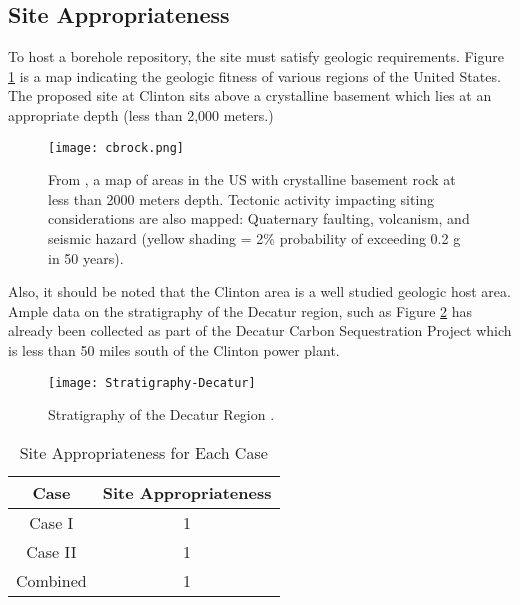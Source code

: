  \subsection{Site Appropriateness} 

  To host a borehole repository, the site must satisfy geologic requirements. 
  Figure \ref{fig:cbrock} is a map indicating the geologic fitness of various 
  regions of the United States. The proposed site at Clinton sits above 
  a crystalline basement which lies at an appropriate depth (less than 2,000 
  meters.)

\begin{figure}[!h] 
  \centering
  \texttt{[image: cbrock.png]}	
        \caption{From \cite{perry_gis_2015}, a map of areas in the US with 
        crystalline basement rock at less than 2000 meters depth. Tectonic 
        activity impacting siting considerations are also mapped:  Quaternary 
        faulting, volcanism, and seismic hazard (yellow shading = 2\% 
        probability of exceeding 0.2 g in 50 years).}
  \label{fig:cbrock}
\end{figure}

    
  
  Also, it should be noted that the Clinton area is a well studied geologic 
  host area. Ample data on the stratigraphy of the Decatur region, such as  
  Figure \ref{fig:Stratigraphy} has already been collected as part of the 
  Decatur Carbon Sequestration Project which is less than 50 miles south of the 
  Clinton power plant.
 
\begin{figure}[!h] 
  \centering
  \texttt{[image: Stratigraphy-Decatur]}	
  \caption{Stratigraphy of the Decatur Region
  \cite{mcdonald_illinois_2012}.}
 \label{fig:Stratigraphy}
  	
 
\end{figure}
  
\begin{table}[h]
	\centering
        \caption {Site Appropriateness for Each Case}
		\begin{tabular}{|c|c|}
			\hline
			Case & Site Appropriateness \\
			\hline
			Case I & 1 \\
			Case II & 1 \\
			Combined & 1\\ 
			\hline
                \end{tabular}
\end{table}

